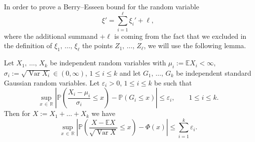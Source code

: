 \documentclass[AHL,Unicode,longabstracts,published]{cedram}
\newcommand{\var}{\operatorname{Var}}
\newcommand{\bbR}{\mathbb{R}}
\newcommand{\bbE}{\mathbb{E}}
\newcommand{\bbP}{\mathbb{P}}
\begin{document}
In order to prove a Berry--Esseen bound for the random variable
\[
\xi'=\sum_{i=1}^\ell \xi_i'+ \ell,
\]
where the additional summand $+\ell$ is coming from the fact that we excluded in the definition of $\xi_1,\,\ldots,\,\xi_\ell$ the points $Z_1,\,\ldots,\,Z_\ell$, we will use the following lemma.


\begin{lemm}\label{lm:GlueBerryEsseen}
Let $X_1,\,\ldots,\,X_k$ be independent random variables with $\mu_i:=\bbE X_i<\infty$, $\sigma_i:=\sqrt{\var X_i}\in(0,\infty)$, $1\leq i\leq k$ and let $G_1,\,\ldots,\,G_k$ be independent standard Gaussian random variables. Let $\varepsilon_i>0$, $1\leq i\leq k$ be such that
\begin{equation}\label{eq:conditions}
\sup_{x\,\in\,\bbR}\left|\bbP\left(\frac{X_i-\mu_i}{\sigma_i}\leq x\right)-\bbP(G_i\leq x)\right|\leq \varepsilon_i,\qquad 1\leq i\leq k.
\end{equation}
Then for $X:=X_1+\ldots+X_k$ we have
\[
\sup_{x\,\in\,\bbR}\left|\bbP\left(\frac{X-\bbE X}{\sqrt{\var X}}\leq x\right)-\Phi(x)\right|\leq \sum_{i=1}^k\varepsilon_i.
\]
\end{lemm}
\end{document}

